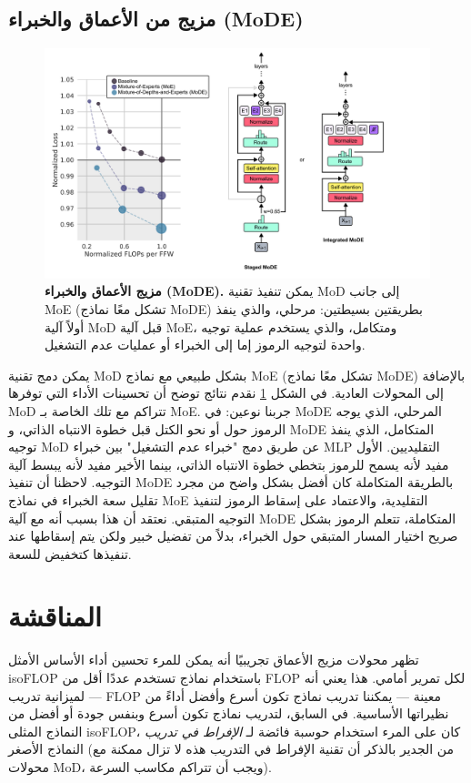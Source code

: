 \documentclass[11pt, a4paper, onecolumn, logo, copyright]{googledeepmind}
\begin{document}
\subsection{مزيج من الأعماق والخبراء (MoDE)}
\begin{figure}[h]
\centering
\includegraphics[width=\textwidth]{mode.png}
\caption{\textbf{مزيج الأعماق والخبراء (MoDE).} يمكن تنفيذ تقنية MoD إلى جانب MoE (تشكل معًا نماذج MoDE) بطريقتين بسيطتين: مرحلي، والذي ينفذ أولاً آلية MoD قبل آلية MoE، ومتكامل، والذي يستخدم عملية توجيه واحدة لتوجيه الرموز إما إلى الخبراء أو عمليات عدم التشغيل.}
\label{fig:mode}
\end{figure}
يمكن دمج تقنية MoD بشكل طبيعي مع نماذج MoE (تشكل معًا نماذج MoDE) بالإضافة إلى المحولات العادية. في الشكل \ref{fig:mode} نقدم نتائج توضح أن تحسينات الأداء التي توفرها MoD تتراكم مع تلك الخاصة بـ MoE. جربنا نوعين: في MoDE المرحلي، الذي يوجه الرموز حول أو نحو الكتل قبل خطوة الانتباه الذاتي، و MoDE المتكامل، الذي ينفذ توجيه MoD عن طريق دمج "خبراء عدم التشغيل" بين خبراء MLP التقليديين. الأول مفيد لأنه يسمح للرموز بتخطي خطوة الانتباه الذاتي، بينما الأخير مفيد لأنه يبسط آلية التوجيه. لاحظنا أن تنفيذ MoDE بالطريقة المتكاملة كان أفضل بشكل واضح من مجرد تقليل سعة الخبراء في نماذج MoE التقليدية، والاعتماد على إسقاط الرموز لتنفيذ التوجيه المتبقي. نعتقد أن هذا بسبب أنه مع آلية MoDE المتكاملة، تتعلم الرموز بشكل صريح اختيار المسار المتبقي حول الخبراء، بدلاً من تفضيل خبير ولكن يتم إسقاطها عند تنفيذها كتخفيض للسعة.

\section{المناقشة}
تظهر محولات مزيج الأعماق تجريبيًا أنه يمكن للمرء تحسين أداء الأساس الأمثل isoFLOP باستخدام نماذج تستخدم عددًا أقل من FLOP لكل تمرير أمامي. هذا يعني أنه --- لميزانية تدريب FLOP معينة --- يمكننا تدريب نماذج تكون أسرع وأفضل أداءً من نظيراتها الأساسية. في السابق، لتدريب نماذج تكون أسرع وبنفس جودة أو أفضل من النماذج المثلى isoFLOP، كان على المرء استخدام حوسبة فائضة لـ \emph{الإفراط في تدريب} النماذج الأصغر (من الجدير بالذكر أن تقنية الإفراط في التدريب هذه لا تزال ممكنة مع محولات MoD، ويجب أن تتراكم مكاسب السرعة).
\end{document}
